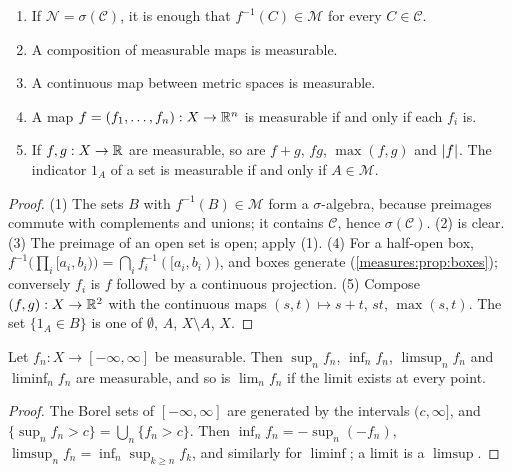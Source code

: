 \begin{notechapter}
\begin{proposition}\label{measures:prop:measurable}
\begin{enumerate}[nosep]
  \item If $\mathcal N = \sigma(\mathcal C)$, it is enough that
        $f^{-1}(C)\in\mathcal M$ for every $C\in\mathcal C$.
  \item A composition of measurable maps is measurable.
  \item A continuous map between metric spaces is measurable.
  \item A map $f = (f_1,\dots,f_n):X\to\mathbb{R}^n$ is measurable if and only
        if each $f_i$ is.
  \item If $f, g:X\to\mathbb{R}$ are measurable, so are $f + g$, $fg$,
        $\max(f, g)$ and $\left|f\right|$. The indicator $1_A$ of a set is
        measurable if and only if $A\in\mathcal M$.
\end{enumerate}
\end{proposition}

\begin{proof}
(1) The sets $B$ with $f^{-1}(B)\in\mathcal M$ form a $\sigma$-algebra,
because preimages commute with complements and unions; it contains
$\mathcal C$, hence $\sigma(\mathcal C)$. (2) is clear. (3) The preimage
of an open set is open; apply (1). (4) For a half-open box,
$f^{-1}\bigl(\prod_i[a_i, b_i)\bigr) = \bigcap_if_i^{-1}([a_i, b_i))$,
and boxes generate (\cref{measures:prop:boxes}); conversely $f_i$ is $f$
followed by a continuous projection. (5) Compose $(f, g):X\to\mathbb{R}^2$ with
the continuous maps $(s, t)\mapsto s + t$, $st$, $\max(s, t)$. The set
$\{1_A\in B\}$ is one of $\emptyset$, $A$, $X\setminus A$, $X$.
\end{proof}

\begin{theorem}\label{measures:thm:limits}
Let $f_n:X\to[-\infty, \infty]$ be measurable. Then $\sup_nf_n$,
$\inf_nf_n$, $\limsup_nf_n$ and $\liminf_nf_n$ are measurable, and so is
$\lim_nf_n$ if the limit exists at every point.
\end{theorem}

\begin{proof}
The Borel sets of $[-\infty, \infty]$ are generated by the intervals
$(c, \infty]$, and
$\{\sup_nf_n > c\} = \bigcup_n\{f_n > c\}$. Then
$\inf_nf_n = -\sup_n(-f_n)$,
$\limsup_nf_n = \inf_n\sup_{k\geq n}f_k$, and similarly for
$\liminf$; a limit is a $\limsup$.
\end{proof}


\end{notechapter}
